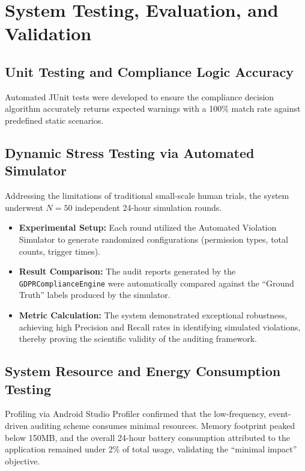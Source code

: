 
\section{System Testing, Evaluation, and Validation}

\subsection{Unit Testing and Compliance Logic Accuracy}
Automated JUnit tests were developed to ensure the compliance decision algorithm accurately returns expected warnings with a 100\% match rate against predefined static scenarios.

\subsection{Dynamic Stress Testing via Automated Simulator}
Addressing the limitations of traditional small-scale human trials, the system underwent $N=50$ independent 24-hour simulation rounds. 
\begin{itemize}
    \item \textbf{Experimental Setup:} Each round utilized the Automated Violation Simulator to generate randomized configurations (permission types, total counts, trigger times).
    \item \textbf{Result Comparison:} The audit reports generated by the \texttt{GDPRComplianceEngine} were automatically compared against the ``Ground Truth'' labels produced by the simulator.
    \item \textbf{Metric Calculation:} The system demonstrated exceptional robustness, achieving high Precision and Recall rates in identifying simulated violations, thereby proving the scientific validity of the auditing framework.
\end{itemize}

\subsection{System Resource and Energy Consumption Testing}
Profiling via Android Studio Profiler confirmed that the low-frequency, event-driven auditing scheme consumes minimal resources. Memory footprint peaked below 150MB, and the overall 24-hour battery consumption attributed to the application remained under 2\% of total usage, validating the ``minimal impact'' objective.